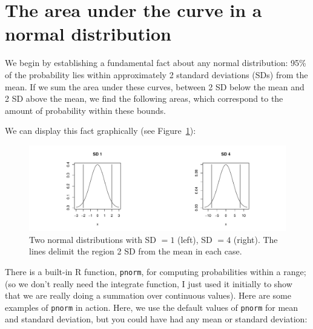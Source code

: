 \documentclass[12pt]{book}\usepackage[]{graphicx}\usepackage[]{color}
\makeatletter
\def\maxwidth{ %
  \ifdim\Gin@nat@width>\linewidth
    \linewidth
  \else
    \Gin@nat@width
  \fi
}
\newenvironment{knitrout}{}{} %
\makeatother
\begin{document}
\section{The area under the curve in a normal distribution}

We begin by establishing a fundamental fact about any normal
distribution: 95\% of the probability lies within approximately 2 standard deviations (SDs) from the
mean. If we sum the area under these curves, between 2 SD below
the mean and 2 SD above the mean, we find the following areas, which
correspond to the amount of probability within these bounds. 

We can display this fact graphically (see Figure~\ref{fig:normal2SD}):



\begin{figure}[!htbp]
  \centering
\begin{knitrout}
\color{fgcolor}
\includegraphics[width=\maxwidth]{figure/unnamed-chunk-10-1} 

\end{knitrout}
  \caption{Two normal distributions with SD $=1$ (left), SD $=4$ (right). The lines delimit the region 2 SD from the mean in each case.}
  \label{fig:normal2SD}
\end{figure}

There is a built-in R function, \texttt{pnorm}, for computing probabilities within a range; (so we don't really need the integrate function, I just used it initially to show that we are really doing a summation over continuous values). Here are some examples of \texttt{pnorm} in action. Here, we use the default values of \texttt{pnorm} for mean and standard deviation, but you could have had any mean or standard deviation: 
\end{document}
